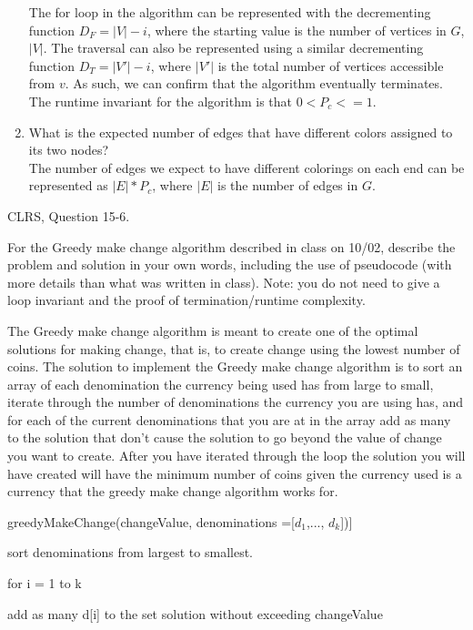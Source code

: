 \documentclass{article}
\begin{document}
\begin{enumerate}
    The for loop in the algorithm can be represented with the decrementing function $D_F = |V| - i$, where the starting value is the number of vertices in $G$, $|V|$. The traversal can also be represented using a similar decrementing function $D_T = |V'| - i$, where $|V'|$ is the total number of vertices accessible from $v$. As such, we can confirm that the algorithm eventually terminates. \\
    
    The runtime invariant for the algorithm is that $0 < P_c <= 1$.
    \item What is the expected number of edges that have different colors
        assigned to its two nodes?\\
        
    The number of edges we expect to have different colorings on each end can be represented as $|E| * P_c$, where $|E|$ is the number of edges in $G$.
\end{enumerate}

\nextprob
CLRS, Question 15-6.

\nextprob
For the Greedy make change algorithm described in class on 10/02, describe the
problem and solution in your own words, including the use of pseudocode (with
more details than what was written in class).  Note: you do not need to give a
loop invariant and the proof of termination/runtime complexity.


The Greedy make change algorithm is meant to create one of the optimal solutions for making change, that is, to create change using the lowest number of coins. The solution to implement the Greedy make change algorithm is to sort an array of each denomination the currency being used has from large to small, iterate through the number of denominations the currency you are using has, and for each of the current denominations that you are at in the array add as many to the solution that don't cause the solution to go beyond the value of change you want to create. After you have iterated through the loop the solution you will have created will have the minimum number of coins given the currency used is a currency that the greedy make change algorithm works for. 


greedyMakeChange(changeValue, denominations ={[$d_1$,..., $d_k$]})]

sort denominations from largest to smallest.
 
for i = 1 to k

\quad 	add as many d{[i]} to the set solution without exceeding changeValue
\end{document}
